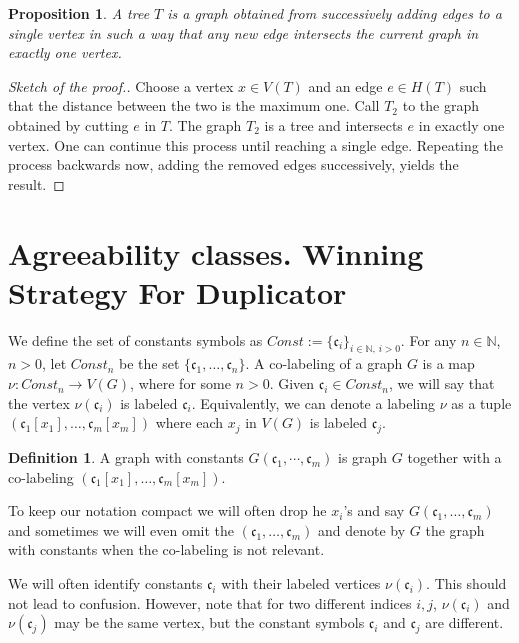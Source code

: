 \documentclass[11pt,notitlepage,a4paper]{article}
\newtheorem{proposition}{Proposition}[section]
\theoremstyle{definition}
\newtheorem{definition}{Definition}[section]
\newcommand{\cc}{\mathfrak{c}}
\newcommand{\N}{\mathbb{N}}
\newcommand{\clist}{\mathfrak{c}_{1}, \cdots, \mathfrak{c}_m}
\begin{document}
\begin{proposition}
	A tree $T$ is a graph obtained from successively adding edges to a single
	vertex in such a way that any new edge intersects the current graph
	in exactly one vertex. 
\end{proposition}
\begin{proof}[Sketch of the proof.]
	Choose a vertex $x\in V(T)$ and an edge $e\in H(T)$ such that 
	the distance between the two is the maximum one. Call $T_2$
	to the graph obtained by cutting $e$ in $T$. The graph $T_2$ 
	is a tree and intersects $e$ in exactly one vertex. 
	One can continue this process until reaching a single edge.
	Repeating the process backwards now, adding the removed 
	edges successively, yields the result.  	
\end{proof}



\section{Agreeability classes. Winning Strategy For Duplicator}

We define the set of constants symbols as
$Const:=\{\mathfrak{c}_i\}_{i\in \N, \, i>0}$.
For any $n\in \N$, $n>0$, let $Const_n$ be the set $\{\mathfrak{c}_1,\dots,\mathfrak{c}_n\}$. 
A co-labeling of a graph $G$ is a map $\nu:Const_n\rightarrow V(G)$,
where for some $n>0$. Given $\mathfrak{c}_i\in Const_n$, 
we will say that the vertex $\nu(\cc_i)$ is labeled $\cc_i$.
Equivalently, we can denote a labeling $\nu$ as a tuple
$(\cc_{1}[x_1],\dots, \cc_m[x_m])$ where each 
$x_j$ in $V(G)$ is labeled $\cc_j$.


\begin{definition} 
	A graph with constants $G(\clist)$ is graph $G$
	together with a co-labeling $(\cc_{1}[x_1],\dots, \cc_m[x_m])$. 
\end{definition}

To keep our notation compact we will often drop 
he $x_i$'s and say $G(\cc_1,\dots, \cc_m)$ and 
sometimes we will even omit the $(\cc_1,\dots, \cc_m)$ and
denote by $G$ the graph with constants when the co-labeling is not 
relevant. \par
We will often identify constants $\cc_i$ with their labeled vertices
$\nu(\cc_i)$. This should not lead to confusion. 
However, note that for two
different indices $i,j$, $\nu(\cc_i)$ and $\nu(\cc_j)$
may be the same vertex,
but the constant symbols $\cc_i$ and $\cc_j$ are different.\par
\end{document}
